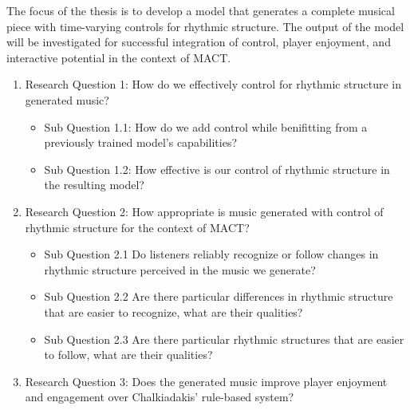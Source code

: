 The focus of the thesis is to develop a model that generates a complete musical piece with time-varying controls for rhythmic structure. The output of the model will be investigated for successful integration of control, player enjoyment, and interactive potential in the context of MACT. 
  
\begin{enumerate}
\item{Research Question 1}: How do we effectively control for rhythmic structure in generated music?
\begin{itemize}
\item{Sub Question 1.1}: How do we add control while benifitting from a previously trained model's capabilities?
\item{Sub Question 1.2}: How effective is our control of rhythmic structure in the resulting model?
\end{itemize}
\item{Research Question 2}: How appropriate is music generated with control of rhythmic structure for the context of MACT?
\begin{itemize}
\item{Sub Question 2.1} Do listeners reliably recognize or follow changes in rhythmic structure perceived in the music we generate?
\item{Sub Question 2.2} Are there particular differences in rhythmic structure that are easier to recognize, what are their qualities?
\item{Sub Question 2.3} Are there particular rhythmic structures that are easier to follow, what are their qualities? 
\end{itemize}
\item {Research Question 3}: Does the generated music improve player enjoyment and engagement over Chalkiadakis' \cite{Chalkiadakis_2022} rule-based system? 
\end{enumerate}
